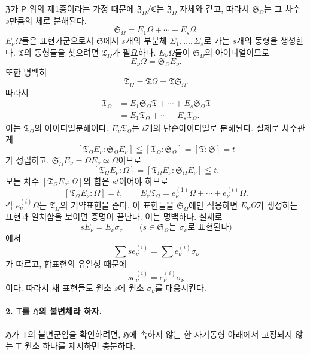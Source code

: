 \(\mathfrak Z\)가 \(\mathsf P\) 위의 제1종이라는 가정 때문에 \(\mathfrak Z_\Omega/\mathfrak C\)는 \(\mathfrak Z_\Omega\) 자체와 같고, 따라서 \(\mathfrak S_\Omega\)는 그 차수 \(s\)만큼의 체로 분해된다.
\[
        \mathfrak S_\Omega
        =E_1\Omega+\cdots+E_s\Omega.
\]
\(E_\nu\Omega\)들은 표현가군으로서 \(\mathfrak S\)에서 \(s\)개의 부분체 \(\Sigma_1,\ldots,\Sigma_s\)로 가는 \(s\)개의 동형을 생성한다. \(\mathfrak T\)의 동형들을 찾으려면 \(\mathfrak T_\Omega\)가 필요하다. \(E_\nu\Omega\)들이 \(\mathfrak S_\Omega\)의 아이디얼이므로
\[
        E_\nu\Omega=\mathfrak S_\Omega E_\nu.
\]
또한 명백히
\[
        \mathfrak T_\Omega
        =\mathfrak T\Omega
        =\mathfrak T\mathfrak S_\Omega.
\]
따라서
\[
\begin{aligned}
\mathfrak T_\Omega
&=E_1\mathfrak S_\Omega\mathfrak T+\cdots
  +E_s\mathfrak S_\Omega\mathfrak T\\
&=E_1\mathfrak T_\Omega+\cdots+E_s\mathfrak T_\Omega.
\end{aligned}
\]
이는 \(\mathfrak T_\Omega\)의 아이디얼분해이다. \(E_\nu\mathfrak T_\Omega\)는 \(t\)개의 단순아이디얼로 분해된다. 실제로 차수관계
\[
[\mathfrak T_\Omega E_\nu:\mathfrak S_\Omega E_\nu]
\leqq[\mathfrak T_\Omega:\mathfrak S_\Omega]
=[\mathfrak T:\mathfrak S]=t
\]
가 성립하고, \(\mathfrak S_\Omega E_\nu=\Omega E_\nu\simeq\Omega\)이므로
\[
[\mathfrak T_\Omega E_\nu:\Omega]
=[\mathfrak T_\Omega E_\nu:\mathfrak S_\Omega E_\nu]
\leqq t.
\]
모든 차수 \([\mathfrak T_\Omega E_\nu:\Omega]\)의 합은 \(st\)이어야 하므로
\[
[\mathfrak T_\Omega E_\nu:\Omega]=t,
\qquad
E_\nu\mathfrak T_\Omega
=e_\nu^{(1)}\Omega+\cdots+e_\nu^{(t)}\Omega.
\]
각 \(e_\nu^{(i)}\Omega\)는 \(\mathfrak T_\Omega\)의 기약표현을 준다. 이 표현들을 \(\mathfrak S_\Omega\)에만 적용하면 \(E_\nu\Omega\)가 생성하는 표현과 일치함을 보이면 증명이 끝난다. 이는 명백하다. 실제로
\[
sE_\nu=E_\nu\sigma_\nu
\qquad
\bigl(s\in\mathfrak S_\Omega\text{는 }\sigma_\nu\text{로 표현된다}\bigr)
\]
에서
\[
        \sum s e_\nu^{(i)}
        =\sum e_\nu^{(i)}\sigma_\nu
\]
가 따르고, 합표현의 유일성 때문에
\[
        s e_\nu^{(i)}=e_\nu^{(i)}\sigma_\nu
\]
이다. 따라서 새 표현들도 원소 \(s\)에 원소 \(\sigma_\nu\)를 대응시킨다.

\paragraph{2. \(\mathsf T\)를 \(\mathfrak H\)의 불변체라 하자.}

\(\mathfrak H\)가 \(\mathsf T\)의 불변군임을 확인하려면, \(\mathfrak H\)에 속하지 않는 한 자기동형 아래에서 고정되지 않는 \(\mathsf T\)-원소 하나를 제시하면 충분하다.

